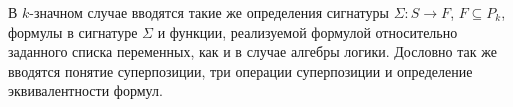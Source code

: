 В $k$-значном случае вводятся такие же определения сигнатуры $\Sigma : S \to F$, $F \subseteq P_k$, формулы в сигнатуре $\Sigma$ и функции, реализуемой формулой относительно заданного списка переменных, как и в случае алгебры логики. Дословно так же вводятся понятие суперпозиции, три операции суперпозиции и определение эквивалентности формул.

